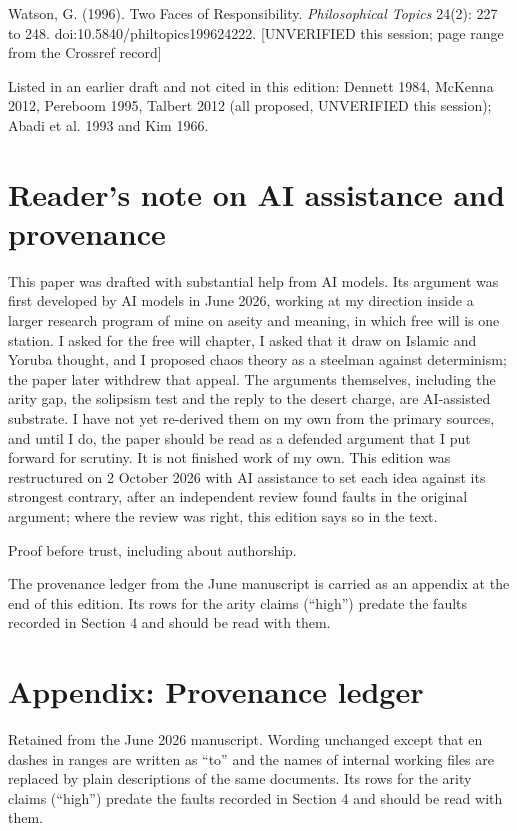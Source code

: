 \documentclass[11pt]{article}
\begin{document}
Watson, G. (1996). Two Faces of Responsibility. \emph{Philosophical Topics} 24(2): 227 to 248. doi:10.5840/\allowbreak{}philtopics199624222. [UNVERIFIED this session; page range from the Crossref record]

Listed in an earlier draft and not cited in this edition: Dennett 1984, McKenna 2012, Pereboom 1995, Talbert 2012 (all proposed, UNVERIFIED this session); Abadi et al. 1993 and Kim 1966.

\section*{Reader's note on AI assistance and provenance}

This paper was drafted with substantial help from AI models. Its argument was first developed by AI models in June 2026, working at my direction inside a larger research program of mine on aseity and meaning, in which free will is one station. I asked for the free will chapter, I asked that it draw on Islamic and Yoruba thought, and I proposed chaos theory as a steelman against determinism; the paper later withdrew that appeal. The arguments themselves, including the arity gap, the solipsism test and the reply to the desert charge, are AI-assisted substrate. I have not yet re-derived them on my own from the primary sources, and until I do, the paper should be read as a defended argument that I put forward for scrutiny. It is not finished work of my own. This edition was restructured on 2 October 2026 with AI assistance to set each idea against its strongest contrary, after an independent review found faults in the original argument; where the review was right, this edition says so in the text.

Proof before trust, including about authorship.

The provenance ledger from the June manuscript is carried as an appendix at the end of this edition. Its rows for the arity claims (``high'') predate the faults recorded in Section 4 and should be read with them.

\section*{Appendix: Provenance ledger}

Retained from the June 2026 manuscript. Wording unchanged except that en dashes in ranges are written as ``to'' and the names of internal working files are replaced by plain descriptions of the same documents. Its rows for the arity claims (``high'') predate the faults recorded in Section 4 and should be read with them.
\end{document}
